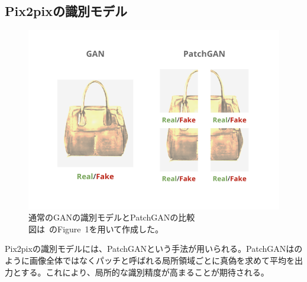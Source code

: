 \subsection{Pix2pixの識別モデル}

\begin{figure}[b]
\centering
\includegraphics[width=0.6\hsize]{figure/patchgan.png}
\caption[通常のGANの識別モデルとPatchGANの比較]{通常のGANの識別モデルとPatchGANの比較\\
図は~\cite{pix2pix}のFigure~1を用いて作成した。}
\label{fig:patchgan}
\end{figure}

Pix2pixの識別モデルには、PatchGANという手法が用いられる。PatchGANはのように画像全体ではなくパッチと呼ばれる局所領域ごとに真偽を求めて平均を出力とする。これにより、局所的な識別精度が高まることが期待される。